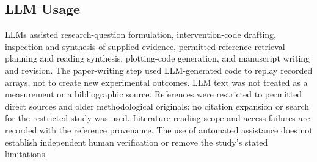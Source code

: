\documentclass{article}
\begin{document}
\subsection{LLM Usage}
LLMs assisted research-question formulation, intervention-code drafting, inspection and synthesis of supplied evidence, permitted-reference retrieval planning and reading synthesis, plotting-code generation, and manuscript writing and revision. The paper-writing step used LLM-generated code to replay recorded arrays, not to create new experimental outcomes. LLM text was not treated as a measurement or a bibliographic source. References were restricted to permitted direct sources and older methodological originals; no citation expansion or search for the restricted study was used. Literature reading scope and access failures are recorded with the reference provenance. The use of automated assistance does not establish independent human verification or remove the study's stated limitations.
\end{document}
